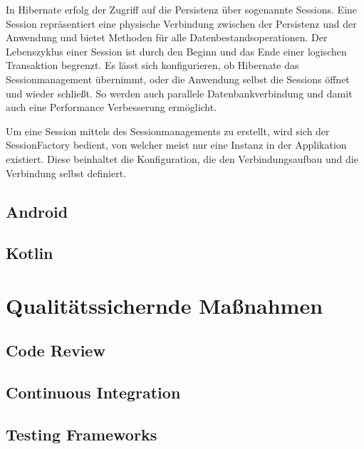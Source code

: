 				In Hibernate erfolg der Zugriff auf die Persistenz über sogenannte Sessions. Eine Session repräsentiert eine physische Verbindung zwischen der Persistenz und der Anwendung und bietet Methoden für alle Datenbestandsoperationen. Der Lebenszyklus einer Session ist durch den Beginn und das Ende einer logischen Transaktion begrenzt. Es lässt sich konfigurieren, ob Hibernate das Sessionmanagement übernimmt, oder die Anwendung selbst die Sessions öffnet und wieder schließt. So werden auch parallele Datenbankverbindung und damit auch eine Performance Verbesserung ermöglicht.
				
				Um eine Session mittels des Sessionmanagements zu erstellt, wird sich der SessionFactory bedient, von welcher meist nur eine Instanz in der Applikation existiert. Diese beinhaltet die Konfiguration, die den Verbindungsaufbau und die Verbindung selbst definiert.
		
		\subsection{Android}
		
			\subsection{Kotlin}
		
	\section{Qualitätssichernde Maßnahmen}
	
		\subsection{Code Review}
		
	
		\subsection{Continuous Integration}
		
		\subsection{Testing Frameworks}
		
	
